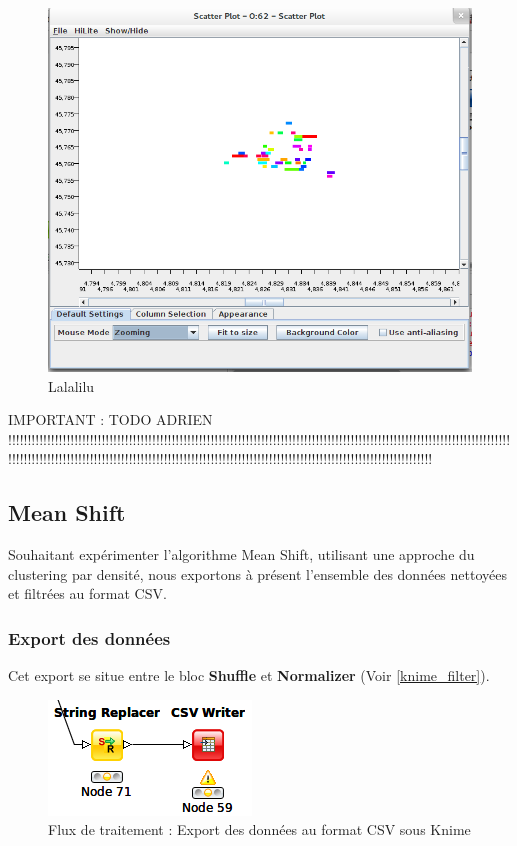 \begin{figure}[H]
    \centering
    \includegraphics[width=\linewidth]{img/dbscan_21.png}
    \caption{Lalalilu}
\end{figure}

IMPORTANT : TODO ADRIEN !!!!!!!!!!!!!!!!!!!!!!!!!!!!!!!!!!!!!!!!!!!!!!!!!!!!!!!!!!!!!!!!!!!!!!!!!!!!!!!!!!!!!!!!!!!!!!!!!!!!!!!!!!!!!!!!!!!!!!!!!!!!!!!!!!!!!!!!!!!!!!!!!!!!!!!!!!!!!!!!!!!!!!!!!!!!!!!!!!!!!!!!!!!!!!!!!!!!!!!!!!!!!!!!!!!!!!!!!!!!!!!!!!!!!!!!!!!!!!
\pagebreak




\subsection{Mean Shift}
Souhaitant expérimenter l'algorithme Mean Shift, utilisant une approche du clustering par densité, nous exportons à présent l'ensemble des données nettoyées et filtrées au format CSV.

\subsubsection{Export des données}
Cet export se situe entre le bloc \textbf{Shuffle} et \textbf{Normalizer} (Voir \ref{knime_filter}).

\begin{figure}[H]
    \centering
    \includegraphics[width=0.25\linewidth]{img/knime_csvwriter.png}
    \caption{Flux de traitement : Export des données au format CSV sous Knime}
\end{figure}

